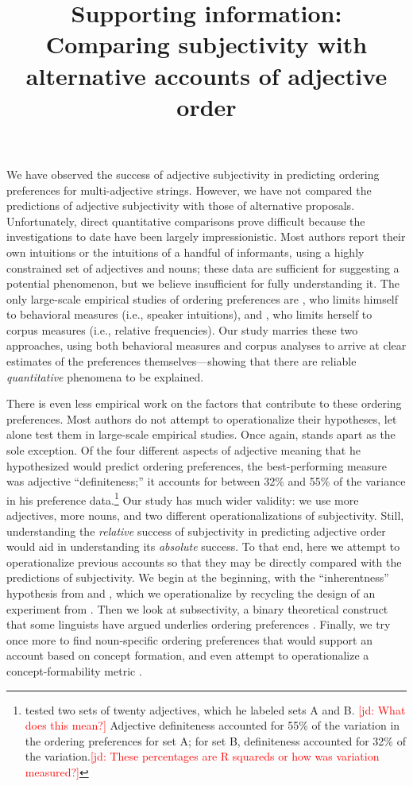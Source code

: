 \documentclass[12pt]{article}
\title{Supporting information: Comparing subjectivity with alternative accounts of adjective order}
\date{}
\newcommand{\jd}[1]{\textcolor{red}{[jd: #1]}}
\begin{document}
\maketitle

We have observed the success of adjective subjectivity in predicting ordering preferences for multi-adjective strings. However, we have not compared the predictions of adjective subjectivity with those of alternative proposals. Unfortunately, direct quantitative comparisons prove difficult because the investigations to date have been largely impressionistic. Most authors report their own intuitions or the intuitions of a handful of informants, using a highly constrained set of adjectives and nouns; these data are sufficient for suggesting a potential phenomenon, but we believe insufficient for fully understanding it. The only large-scale empirical studies of ordering preferences are \citet{martin1969}, who limits himself to behavioral measures (i.e., speaker intuitions), and \citet{wulff2003}, who limits herself to corpus measures (i.e., relative frequencies). Our study marries these two approaches, using both behavioral measures and corpus analyses to arrive at clear estimates of the preferences themselves---showing that there are reliable \emph{quantitative} phenomena to be explained.

There is even less empirical work on the factors that contribute to these ordering preferences. Most authors do not attempt to operationalize their hypotheses, let alone test them in large-scale empirical studies. Once again, \citet{martin1969} stands apart as the sole exception. Of the four different aspects of adjective meaning that he hypothesized would predict ordering preferences, the best-performing measure was adjective ``definiteness;'' it accounts for between 32\% and 55\% of the variance in his preference data.\footnote{\citet{martin1969} tested two sets of twenty adjectives, which he labeled sets A and B. \jd{What does this mean?} Adjective definiteness accounted for 55\% of the variation in the ordering preferences for set A; for set B, definiteness accounted for 32\% of the variation.\jd{These percentages are  R squareds or how was variation measured?}} Our study has much wider validity: we use more adjectives, more nouns, and two different operationalizations of subjectivity. Still, understanding the \emph{relative} success of subjectivity in predicting adjective order would aid in understanding its \emph{absolute} success. To that end, here we attempt to operationalize previous accounts so that they may be directly compared with the predictions of subjectivity. We begin at the beginning, with the ``inherentness'' hypothesis from \citet{sweet1898} and \citet{whorf1945}, which we operationalize by recycling the design of an experiment from \citet{martin1969}. Then we look at subsectivity, a binary theoretical construct that some linguists have argued underlies ordering preferences \citep[e.g.,][]{truswell2009}. Finally, we try once more to find noun-specific ordering preferences that would support an account based on concept formation, and even attempt to operationalize a concept-formability metric \citep{McNally2004,bouchard2005,svenonius2008}.
\end{document}
